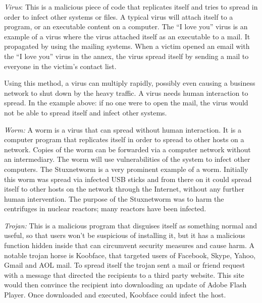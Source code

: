 % 
 
\begin{description}
\item \textit{Virus}: This is a malicious piece of code that replicates itself and tries to spread in order  to infect other systems or files. A typical virus will attach itself to a program, or an executable content on a computer. The ``I love you'' virus is an example of a virus where the virus attached itself as an executable to a mail. It propagated by using the mailing systems. When a victim opened an email with the ``I love you'' virus in the annex, the virus spread itself by sending a mail to everyone in the victim's contact list. 

Using this method, a virus can multiply rapidly, possibly even causing a business network to shut down by the heavy traffic. A virus needs human interaction to spread. In the example above: if no one were to open the mail, the virus would not be able to spread itself and infect other systems.

\item \textit{Worm:} A worm is a virus that can spread without human interaction. It is a computer program that replicates itself in order to spread to other hosts on a network. Copies of the worm can be forwarded via a computer network without an intermediary. The worm will use vulnerabilities of the system to infect other computers.
The Stuxnetworm is a very prominent example of a worm. Initially this worm was spread via infected USB sticks and from there on it could spread itself to other hosts on the network through the Internet, without any further human intervention. The purpose of the Stuxnetworm was to harm the centrifuges in nuclear reactors; many reactors have been infected.  

\item \textit{Trojan:} This is a malicious program that disguises itself as something normal and useful, so that users won't be suspicious of installing it, but it has a malicious function hidden inside that can circumvent security measures and cause harm.  A notable trojan horse is Koobface, that targeted users of Facebook, Skype, Yahoo, Gmail and AOL mail. To spread itself the trojan sent a mail or friend request with a message that directed the recipients to a third party website. This site would then convince the recipient into downloading an update of Adobe Flash Player. Once downloaded and executed, Koobface could infect the host.

\end{description}

